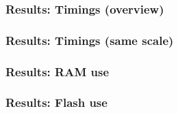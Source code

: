 \begin{frame}[c]
    \centering
    \frametitle{Results: Timings (overview)}
    \resizebox{!}{.35\textheight}{
        
    }
\end{frame}

\begin{frame}[c]
    \centering
    \frametitle{Results: Timings (same scale)}
    \resizebox{!}{.35\textheight}{
        
    }
\end{frame}

\begin{frame}[c]
    \frametitle{Results: RAM use}
    \centering
    
\end{frame}

\begin{frame}
    \frametitle{Results: Flash use}
    \centering
    
\end{frame}

